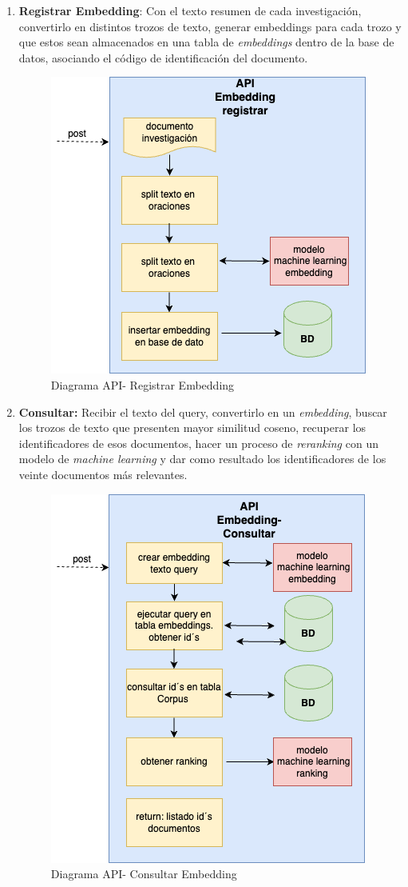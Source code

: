 \documentclass[
  12pt,
  openany]{book}
\begin{document}
\begin{enumerate}
\def\labelenumi{\arabic{enumi}.}
\item
  \textbf{Registrar Embedding}: Con el texto resumen de cada investigación, convertirlo en distintos trozos de texto, generar embeddings para cada trozo y que estos sean almacenados en una tabla de \emph{embeddings} dentro de la base de datos, asociando el código de identificación del documento.

  \begin{figure}

  {\centering \includegraphics[width=0.45\linewidth]{images/05-desarrollo/5_ciclo/diagramapiregistrar} 

  }

  \caption{Diagrama API- Registrar Embedding}\label{fig:semanticoregistrar}
  \end{figure}
\item
  \textbf{Consultar:} Recibir el texto del query, convertirlo en un \emph{embedding}, buscar los trozos de texto que presenten mayor similitud coseno, recuperar los identificadores de esos documentos, hacer un proceso de \emph{reranking} con un modelo de \emph{machine learning} y dar como resultado los identificadores de los veinte documentos más relevantes.

  \begin{figure}

  {\centering \includegraphics[width=0.45\linewidth]{images/05-desarrollo/5_ciclo/diagramapiconsultar} 

  }

  \caption{Diagrama API- Consultar Embedding}\label{fig:semanticoconsultar}
  \end{figure}
\end{enumerate}
\end{document}
